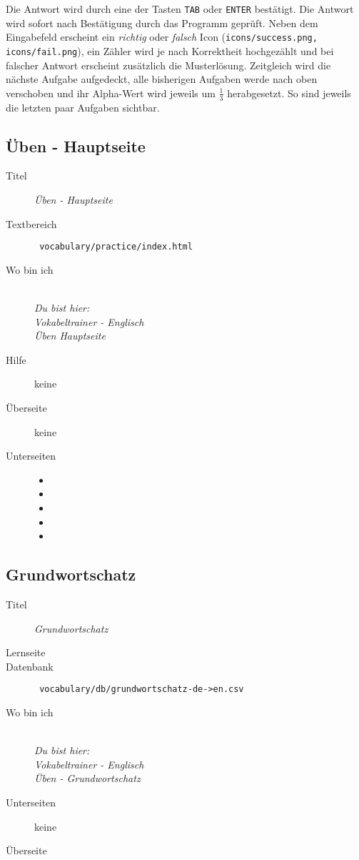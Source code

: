Die Antwort wird durch eine der Tasten \texttt{TAB} oder \texttt{ENTER} bestätigt. 
Die Antwort wird sofort nach Bestätigung durch das Programm geprüft. 
Neben dem Eingabefeld erscheint ein \emph{richtig} oder \emph{falsch} Icon (\texttt{icons/success.png, icons/fail.png}), ein Zähler wird je nach Korrektheit hochgezählt und bei falscher Antwort erscheint zusätzlich die Musterlösung.
Zeitgleich wird die nächste Aufgabe aufgedeckt, alle bisherigen Aufgaben werde nach oben verschoben und ihr Alpha-Wert wird jeweils um $\frac 1 3$ herabgesetzt.
So sind jeweils die letzten paar Aufgaben sichtbar.

\subsection{ Üben - Hauptseite }
\label{has:voc-practice-page0}
\begin{description}
	\item[Titel] \emph{ Üben - Hauptseite }
	\item[Textbereich] \texttt{ vocabulary/practice/index.html }
	\item[Wo bin ich] \emph{\\Du bist hier:\\Vokabeltrainer - Englisch\\Üben Hauptseite}
	\item[Hilfe] keine
	\item[Überseite] keine
	\item[Unterseiten]
	\begin{itemize}
		\item {}
		\item {}
		\item {}
		\item {}
		\item {}
	\end{itemize}
\end{description}

\subsection{ Grundwortschatz }
\label{has:voc-practice-page1}
\begin{description}
	\item[Titel] \emph{ Grundwortschatz }
	\item[Lernseite] 
	\item[Datenbank] \texttt{ vocabulary/db/grundwortschatz-de->en.csv }
	\item[Wo bin ich] \emph{\\Du bist hier:\\Vokabeltrainer - Englisch\\Üben - Grundwortschatz}
	\item[Unterseiten] keine
	\item[Überseite] 
\end{description}


